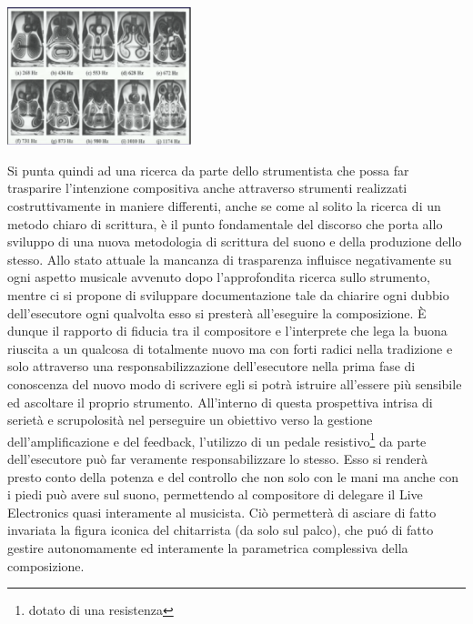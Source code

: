 \documentclass[oneside]{article}
\begin{document}
\begin{multicols*}{2}
\includegraphics[width=0.4\textwidth]{img/chladni1.png}

\noindent
Si punta quindi ad una ricerca da parte dello strumentista che possa far trasparire l'intenzione compositiva anche attraverso strumenti realizzati costruttivamente in maniere differenti, anche se come al solito la ricerca di un metodo chiaro di scrittura, è il punto fondamentale del discorso che porta allo sviluppo di una nuova metodologia di scrittura del suono e della produzione dello stesso. Allo stato attuale la mancanza di trasparenza influisce negativamente su ogni aspetto musicale avvenuto dopo l'approfondita ricerca sullo strumento, mentre ci si propone di sviluppare documentazione tale da chiarire ogni dubbio dell'esecutore ogni qualvolta esso si presterà all'eseguire la composizione. È dunque il rapporto di fiducia tra il compositore e l'interprete che lega la buona riuscita a un qualcosa di totalmente nuovo ma con forti radici nella tradizione e solo attraverso una responsabilizzazione dell'esecutore nella prima fase di conoscenza del nuovo modo di scrivere egli si potrà istruire all'essere più sensibile ed ascoltare il proprio strumento. All'interno di questa prospettiva intrisa di serietà e scrupolosità nel perseguire un obiettivo verso la gestione dell'amplificazione e del feedback, l'utilizzo di un pedale resistivo\footnote{dotato di una resistenza}  da parte dell'esecutore può far veramente responsabilizzare lo stesso. Esso si renderà presto conto della potenza e del controllo che non solo con le mani ma anche con i piedi può avere sul suono, permettendo al compositore di delegare il Live Electronics quasi interamente al musicista. Ciò permetterà di asciare di fatto invariata la figura iconica del chitarrista (da solo sul palco), che puó di fatto gestire autonomamente ed interamente la parametrica complessiva della composizione.\newline


\end{multicols*}
\end{document}
